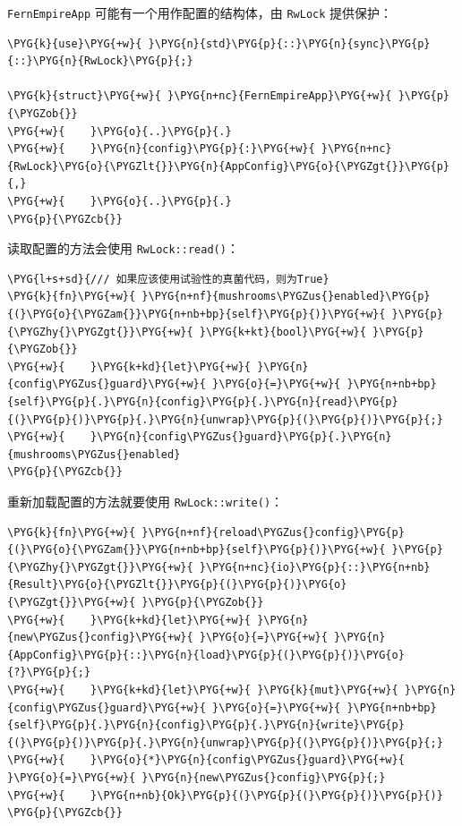 \texttt{FernEmpireApp} 可能有一个用作配置的结构体，由 \texttt{RwLock} 提供保护：

\begin{Verbatim}[commandchars=\\\{\},breaklines=true,breakanywhere=true,fontsize=\codefont,xleftmargin=17bp]
\PYG{k}{use}\PYG{+w}{ }\PYG{n}{std}\PYG{p}{::}\PYG{n}{sync}\PYG{p}{::}\PYG{n}{RwLock}\PYG{p}{;}

\PYG{k}{struct}\PYG{+w}{ }\PYG{n+nc}{FernEmpireApp}\PYG{+w}{ }\PYG{p}{\PYGZob{}}
\PYG{+w}{    }\PYG{o}{..}\PYG{p}{.}
\PYG{+w}{    }\PYG{n}{config}\PYG{p}{:}\PYG{+w}{ }\PYG{n+nc}{RwLock}\PYG{o}{\PYGZlt{}}\PYG{n}{AppConfig}\PYG{o}{\PYGZgt{}}\PYG{p}{,}
\PYG{+w}{    }\PYG{o}{..}\PYG{p}{.}
\PYG{p}{\PYGZcb{}}
\end{Verbatim}

读取配置的方法会使用 \texttt{RwLock::read()}：

\begin{Verbatim}[commandchars=\\\{\},breaklines=true,breakanywhere=true,fontsize=\codefont,xleftmargin=17bp]
\PYG{l+s+sd}{/// 如果应该使用试验性的真菌代码，则为True}
\PYG{k}{fn}\PYG{+w}{ }\PYG{n+nf}{mushrooms\PYGZus{}enabled}\PYG{p}{(}\PYG{o}{\PYGZam{}}\PYG{n+nb+bp}{self}\PYG{p}{)}\PYG{+w}{ }\PYG{p}{\PYGZhy{}\PYGZgt{}}\PYG{+w}{ }\PYG{k+kt}{bool}\PYG{+w}{ }\PYG{p}{\PYGZob{}}
\PYG{+w}{    }\PYG{k+kd}{let}\PYG{+w}{ }\PYG{n}{config\PYGZus{}guard}\PYG{+w}{ }\PYG{o}{=}\PYG{+w}{ }\PYG{n+nb+bp}{self}\PYG{p}{.}\PYG{n}{config}\PYG{p}{.}\PYG{n}{read}\PYG{p}{(}\PYG{p}{)}\PYG{p}{.}\PYG{n}{unwrap}\PYG{p}{(}\PYG{p}{)}\PYG{p}{;}
\PYG{+w}{    }\PYG{n}{config\PYGZus{}guard}\PYG{p}{.}\PYG{n}{mushrooms\PYGZus{}enabled}
\PYG{p}{\PYGZcb{}}
\end{Verbatim}

重新加载配置的方法就要使用 \texttt{RwLock::write()}：

\begin{Verbatim}[commandchars=\\\{\},breaklines=true,breakanywhere=true,fontsize=\codefont,xleftmargin=17bp]
\PYG{k}{fn}\PYG{+w}{ }\PYG{n+nf}{reload\PYGZus{}config}\PYG{p}{(}\PYG{o}{\PYGZam{}}\PYG{n+nb+bp}{self}\PYG{p}{)}\PYG{+w}{ }\PYG{p}{\PYGZhy{}\PYGZgt{}}\PYG{+w}{ }\PYG{n+nc}{io}\PYG{p}{::}\PYG{n+nb}{Result}\PYG{o}{\PYGZlt{}}\PYG{p}{(}\PYG{p}{)}\PYG{o}{\PYGZgt{}}\PYG{+w}{ }\PYG{p}{\PYGZob{}}
\PYG{+w}{    }\PYG{k+kd}{let}\PYG{+w}{ }\PYG{n}{new\PYGZus{}config}\PYG{+w}{ }\PYG{o}{=}\PYG{+w}{ }\PYG{n}{AppConfig}\PYG{p}{::}\PYG{n}{load}\PYG{p}{(}\PYG{p}{)}\PYG{o}{?}\PYG{p}{;}
\PYG{+w}{    }\PYG{k+kd}{let}\PYG{+w}{ }\PYG{k}{mut}\PYG{+w}{ }\PYG{n}{config\PYGZus{}guard}\PYG{+w}{ }\PYG{o}{=}\PYG{+w}{ }\PYG{n+nb+bp}{self}\PYG{p}{.}\PYG{n}{config}\PYG{p}{.}\PYG{n}{write}\PYG{p}{(}\PYG{p}{)}\PYG{p}{.}\PYG{n}{unwrap}\PYG{p}{(}\PYG{p}{)}\PYG{p}{;}
\PYG{+w}{    }\PYG{o}{*}\PYG{n}{config\PYGZus{}guard}\PYG{+w}{ }\PYG{o}{=}\PYG{+w}{ }\PYG{n}{new\PYGZus{}config}\PYG{p}{;}
\PYG{+w}{    }\PYG{n+nb}{Ok}\PYG{p}{(}\PYG{p}{(}\PYG{p}{)}\PYG{p}{)}
\PYG{p}{\PYGZcb{}}
\end{Verbatim}

